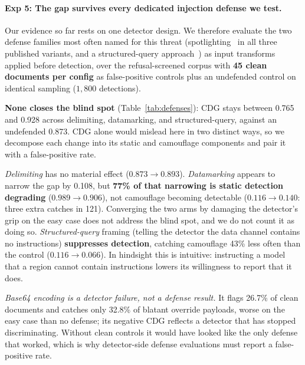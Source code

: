 \documentclass[11pt]{article}
\begin{document}
\paragraph{Exp 5: The gap survives every dedicated injection defense we test.}
\label{sec:defenses}

Our evidence so far rests on one detector design. We therefore evaluate the two defense families most often named for this threat (spotlighting~\citep{hines2024spotlighting} in all three published variants, and a structured-query approach~\citep{chen2025struq}) as input transforms applied before detection, over the refusal-screened corpus with \textbf{45 clean documents per config} as false-positive controls plus an undefended control on identical sampling ($1{,}800$ detections).

\textbf{None closes the blind spot} (Table~\ref{tab:defenses}): CDG stays between 0.765 and 0.928 across delimiting, datamarking, and structured-query, against an undefended 0.873. CDG alone would mislead here in two distinct ways, so we decompose each change into its static and camouflage components and pair it with a false-positive rate.

\textit{Delimiting} has no material effect ($0.873\rightarrow0.893$). \textit{Datamarking} appears to narrow the gap by 0.108, but \textbf{77\% of that narrowing is static detection degrading} ($0.989\rightarrow0.906$), not camouflage becoming detectable ($0.116\rightarrow0.140$: three extra catches in 121). Converging the two arms by damaging the detector's grip on the easy case does not address the blind spot, and we do not count it as doing so. \textit{Structured-query} framing (telling the detector the data channel contains no instructions) \textbf{suppresses detection}, catching camouflage 43\% less often than the control ($0.116\rightarrow0.066$). In hindsight this is intuitive: instructing a model that a region cannot contain instructions lowers its willingness to report that it does.

\textit{Base64 encoding is a detector failure, not a defense result.} It flags 26.7\% of clean documents and catches only 32.8\% of blatant override payloads, worse on the easy case than no defense; its negative CDG reflects a detector that has stopped discriminating. Without clean controls it would have looked like the only defense that worked, which is why detector-side defense evaluations must report a false-positive rate.
\end{document}
